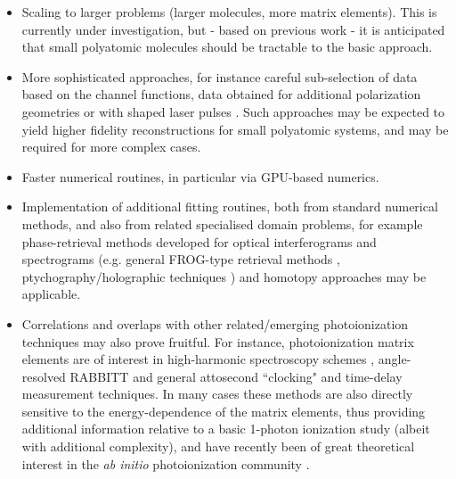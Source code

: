 \documentclass[10pt]{article}
\begin{document}
\begin{itemize}
\item Scaling to larger problems (larger molecules, more matrix elements). This is currently under investigation, but - based on previous work \cite{hockett2009RotationallyResolvedPhotoelectron, hockett2018QMP2} - it is anticipated that small polyatomic molecules should be tractable to the basic approach. 
\item More sophisticated approaches, for instance careful sub-selection of data based on the channel functions, data obtained for additional polarization geometries or with shaped laser pulses \cite{hockett2014CompletePhotoionizationExperiments, hockett2015CoherentControlPhotoelectron, hockett2015CompletePhotoionizationExperiments,hockett2018QMP1}. Such approaches may be expected to yield higher fidelity reconstructions for small polyatomic systems, and may be required for more complex cases.
\item Faster numerical routines, in particular via GPU-based numerics.
\item Implementation of additional fitting routines, both from standard numerical methods, and also from related specialised domain problems, for example phase-retrieval methods developed for optical interferograms and spectrograms (e.g. general FROG-type retrieval methods \cite{trebino2000FrequencyResolvedOpticalGating}, ptychography/holographic techniques \cite{Spangenberg2015b, Spangenberg2015c}) and homotopy \cite{Sommese2005} approaches may be applicable.
\item Correlations and overlaps with other related/emerging photoionization techniques may also prove fruitful. For instance, photoionization matrix elements are of interest in high-harmonic spectroscopy schemes \cite{Lock2012}, angle-resolved RABBITT \cite{hockett2017AngleresolvedRABBITTTheory,villeneuve2017CoherentImagingAttosecond} and general attosecond ``clocking" and time-delay measurement techniques. In many cases these methods are also directly sensitive to the energy-dependence of the matrix elements, thus providing additional information relative to a basic 1-photon ionization study (albeit with additional complexity), and have recently been of great theoretical interest in the \textit{ab initio} photoionization community \cite{Feist2014,benda2022AnalysisRABITTTime}.

\end{itemize}
\end{document}
